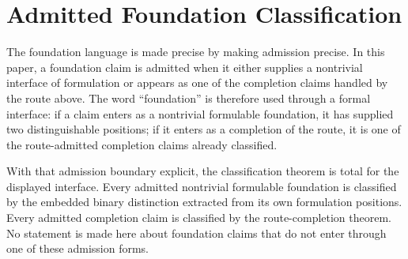 \documentclass[11pt]{article}
\begin{document}
\section{Admitted Foundation Classification}

The foundation language is made precise by making admission precise.  In
this paper, a foundation claim is admitted when it either supplies a
nontrivial interface of formulation or appears as one of the completion
claims handled by the route above.  The word ``foundation'' is therefore
used through a formal interface: if a claim enters as a nontrivial
formulable foundation, it has supplied two distinguishable positions; if
it enters as a completion of the route, it is one of the route-admitted
completion claims already classified.

With that admission boundary explicit, the classification theorem is
total for the displayed interface.  Every admitted nontrivial formulable
foundation is classified by the embedded binary distinction extracted
from its own formulation positions.  Every admitted completion claim is
classified by the route-completion theorem.  No statement is made here
about foundation claims that do not enter through one of these admission
forms.
\end{document}
